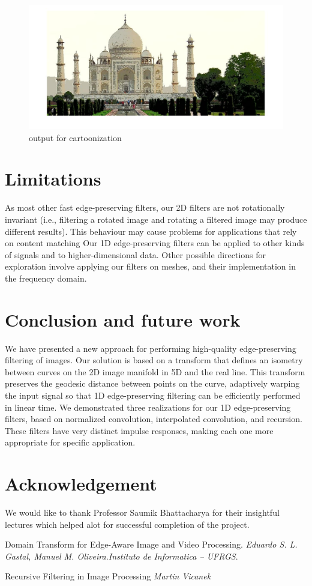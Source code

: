 \documentclass[conference]{IEEEtran}
\begin{document}
  \begin{figure}
 	\includegraphics[width = \linewidth]{taj_out.jpg}
 	\caption{output for cartoonization}
 	\label{fig:outputCartoon}
 \end{figure}
 
 \section{Limitations}
 As most other fast edge-preserving filters, our 2D filters are not rotationally invariant (i.e., filtering a rotated image and rotating a filtered image may produce different results). This behaviour may cause problems for applications that rely on content matching
Our 1D edge-preserving filters can be applied to other kinds of signals and to higher-dimensional data. Other possible directions for exploration involve applying our filters on meshes, and their implementation in the frequency domain.

 
 \section{Conclusion and future work}
We have presented a new approach for performing high-quality edge-preserving filtering of images. Our solution is based on a transform that defines an isometry between curves on the 2D image manifold in 5D and the real line. This transform preserves the geodesic distance between points on the curve, adaptively warping the input signal so that 1D edge-preserving filtering can be efficiently performed in linear time. We demonstrated three realizations for our 1D edge-preserving filters, based on normalized convolution, interpolated convolution, and recursion. These filters have very distinct impulse responses, making each one more appropriate for specific application.

\section{Acknowledgement}
We would like to thank Professor Saumik Bhattacharya for their insightful lectures which helped alot for successful completion of the project. 

\begin{thebibliography}{9}
Domain Transform for Edge-Aware Image and Video Processing.
\textit{Eduardo S. L. Gastal, Manuel M. Oliveira.Instituto de Informatica – UFRGS}. 
 
Recursive Filtering in Image Processing 
\textit{Martin Vicanek}
 
\end{thebibliography}
\end{document}
